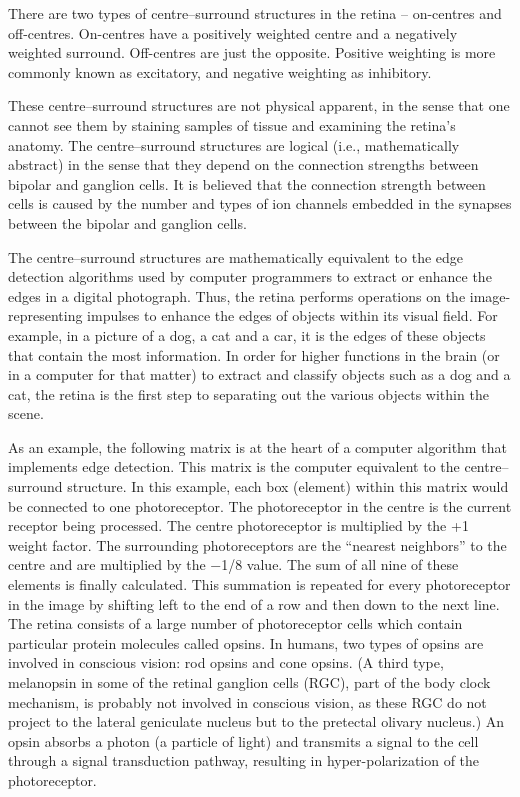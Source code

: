 There are two types of centre--surround structures in the retina -- on-centres and off-centres. On-centres have a positively weighted centre and a negatively weighted surround. Off-centres are just the opposite. Positive weighting is more commonly known as excitatory, and negative weighting as inhibitory.

These centre--surround structures are not physical apparent, in the sense that one cannot see them by staining samples of tissue and examining the retina's anatomy. The centre--surround structures are logical (i.e., mathematically abstract) in the sense that they depend on the connection strengths between bipolar and ganglion cells. It is believed that the connection strength between cells is caused by the number and types of ion channels embedded in the synapses between the bipolar and ganglion cells.

The centre--surround structures are mathematically equivalent to the edge detection algorithms used by computer programmers to extract or enhance the edges in a digital photograph. Thus, the retina performs operations on the image-representing impulses to enhance the edges of objects within its visual field. For example, in a picture of a dog, a cat and a car, it is the edges of these objects that contain the most information. In order for higher functions in the brain (or in a computer for that matter) to extract and classify objects such as a dog and a cat, the retina is the first step to separating out the various objects within the scene.

As an example, the following matrix is at the heart of a computer algorithm that implements edge detection. This matrix is the computer equivalent to the centre--surround structure. In this example, each box (element) within this matrix would be connected to one photoreceptor. The photoreceptor in the centre is the current receptor being processed. The centre photoreceptor is multiplied by the +1 weight factor. The surrounding photoreceptors are the ``nearest neighbors'' to the centre and are multiplied by the −1/8 value. The sum of all nine of these elements is finally calculated. This summation is repeated for every photoreceptor in the image by shifting left to the end of a row and then down to the next line.
The retina consists of a large number of photoreceptor cells which contain particular protein molecules called opsins. In humans, two types of opsins are involved in conscious vision: rod opsins and cone opsins. (A third type, melanopsin in some of the retinal ganglion cells (RGC), part of the body clock mechanism, is probably not involved in conscious vision, as these RGC do not project to the lateral geniculate nucleus but to the pretectal olivary nucleus.) An opsin absorbs a photon (a particle of light) and transmits a signal to the cell through a signal transduction pathway, resulting in hyper-polarization of the photoreceptor.

